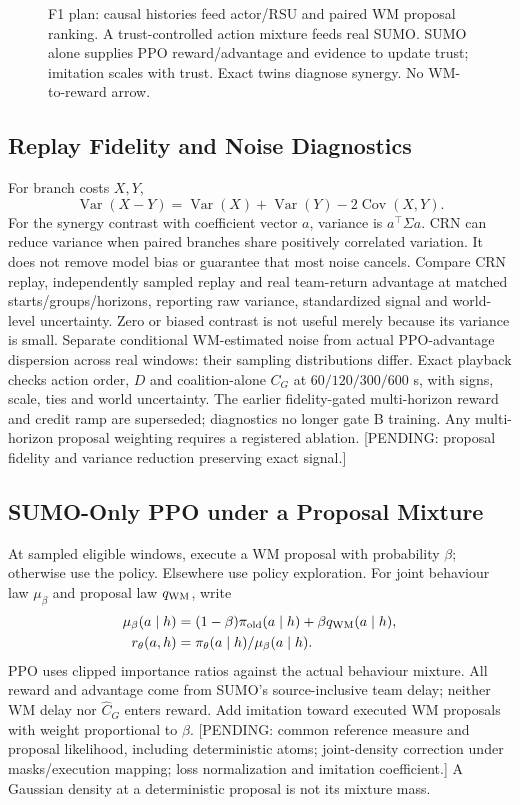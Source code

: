 \documentclass[conference]{IEEEtran}
\newcommand{\pending}[1]{\textcolor{red!80!black}{[PENDING: #1]}}
\newcommand{\blankpanel}[1]{\fbox{\rule{0pt}{#1}\rule{0.94\columnwidth}{0pt}}}
\begin{document}
\begin{figure}[t]
\centering\blankpanel{1.20in}
\caption{F1 plan: causal histories feed actor/RSU and paired WM proposal
ranking. A trust-controlled action mixture feeds real SUMO. SUMO alone supplies
PPO reward/advantage and evidence to update trust; imitation scales with trust.
Exact twins diagnose synergy. No WM-to-reward arrow.}
\label{fig:method}
\end{figure}

\subsection{Replay Fidelity and Noise Diagnostics}
For branch costs $X,Y$,
\begin{equation}
\operatorname{Var}(X-Y)=\operatorname{Var}(X)+\operatorname{Var}(Y)
-2\operatorname{Cov}(X,Y).
\end{equation}
For the synergy contrast with coefficient vector $a$, variance is
$a^\top\Sigma a$. CRN can reduce variance when paired branches share
positively correlated variation. It does not remove model bias or guarantee
that most noise cancels. Compare CRN replay, independently sampled replay
and real team-return advantage at matched starts/groups/horizons, reporting
raw variance, standardized signal and world-level uncertainty. Zero or biased
contrast is not useful merely because its variance is small. Separate
conditional WM-estimated noise from actual PPO-advantage dispersion across
real windows: their sampling distributions differ.
Exact playback checks action order, $D$ and coalition-alone $C_G$ at
$60/120/300/600$ s, with signs, scale, ties and world uncertainty.
The earlier fidelity-gated multi-horizon reward and credit ramp are superseded;
diagnostics no longer gate B training. Any multi-horizon proposal weighting
requires a registered ablation.
\pending{proposal fidelity and variance reduction preserving exact signal.}

\subsection{SUMO-Only PPO under a Proposal Mixture}
At sampled eligible windows, execute a WM proposal with probability $\beta$;
otherwise use the policy. Elsewhere use policy exploration. For joint behaviour
law $\mu_\beta$ and proposal law $q_{\rm WM}$, write
\begin{align}
\mu_\beta(a\mid h)&=(1-\beta)\pi_{\rm old}(a\mid h)+\beta q_{\rm WM}(a\mid h),\\
 r_\theta(a,h)&=\pi_\theta(a\mid h)/\mu_\beta(a\mid h).
\end{align}
PPO uses clipped importance ratios against the actual behaviour mixture.
All reward and advantage come from SUMO's source-inclusive team delay;
neither WM delay nor $\widehat C_G$ enters reward. Add imitation toward
executed WM proposals with weight proportional to $\beta$.
\pending{common reference measure and proposal likelihood, including
deterministic atoms; joint-density correction under masks/execution mapping;
loss normalization and imitation coefficient.}
A Gaussian density at a deterministic proposal is not its mixture mass.
\end{document}
